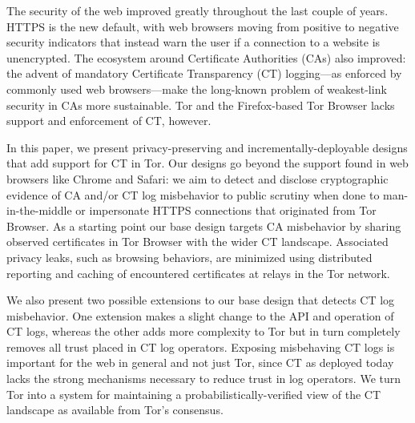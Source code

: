 The security of the web improved greatly throughout the last couple of years.
HTTPS is the new default, with web browsers moving from positive to
negative security indicators that instead warn the user if a connection to a
website is unencrypted.  The ecosystem around Certificate Authorities (CAs) also
improved:
	the advent of mandatory Certificate Transparency (CT) logging---as
	enforced by commonly used web browsers---make the long-known problem of
	weakest-link security in CAs more sustainable.
Tor and the Firefox-based Tor Browser lacks support and enforcement of CT,
however.

\hspace{12pt}
In this paper, we present privacy-preserving and incrementally-deployable
designs that add support for CT in Tor. Our designs go beyond the
support found in web browsers like Chrome and Safari:
	we aim to detect and disclose cryptographic evidence of CA and/or
	CT log misbehavior to public scrutiny when done to man-in-the-middle or
	impersonate HTTPS connections that originated from Tor Browser.
As a starting point our base design targets CA misbehavior by sharing observed
certificates in Tor Browser with the wider CT landscape.  Associated privacy
leaks, such as browsing behaviors, are minimized using distributed reporting and
caching of encountered certificates at relays in the Tor network.


\hspace{12pt}
We also present two possible extensions to our base design that detects CT log
misbehavior. One extension makes a slight change to the API and operation
of CT logs, whereas the other adds more complexity to Tor but in turn completely
removes all trust placed in CT log operators.  Exposing misbehaving CT logs
is important for the web in general and not just Tor, since CT as deployed today
lacks the strong mechanisms necessary to reduce trust in log operators.  We turn
Tor into a system for maintaining a probabilistically-verified view of the CT
landscape as available from Tor’s consensus.
